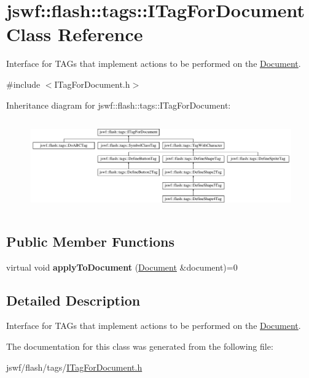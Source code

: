 \hypertarget{classjswf_1_1flash_1_1tags_1_1_i_tag_for_document}{\section{jswf\+:\+:flash\+:\+:tags\+:\+:I\+Tag\+For\+Document Class Reference}
\label{classjswf_1_1flash_1_1tags_1_1_i_tag_for_document}
}


Interface for {\ttfamily T\+A\+G}s that implement actions to be performed on the \hyperlink{classjswf_1_1flash_1_1_document}{Document}.  




{\ttfamily \#include $<$I\+Tag\+For\+Document.\+h$>$}

Inheritance diagram for jswf\+:\+:flash\+:\+:tags\+:\+:I\+Tag\+For\+Document\+:\begin{figure}[H]
\begin{center}
\leavevmode
\includegraphics[height=3.962264cm]{classjswf_1_1flash_1_1tags_1_1_i_tag_for_document}
\end{center}
\end{figure}
\subsection*{Public Member Functions}
\begin{DoxyCompactItemize}
\item 
\hypertarget{classjswf_1_1flash_1_1tags_1_1_i_tag_for_document_a514c81dde789ab9e919ebd4873502903}{virtual void {\bfseries apply\+To\+Document} (\hyperlink{classjswf_1_1flash_1_1_document}{Document} \&document)=0}\label{classjswf_1_1flash_1_1tags_1_1_i_tag_for_document_a514c81dde789ab9e919ebd4873502903}

\end{DoxyCompactItemize}


\subsection{Detailed Description}
Interface for {\ttfamily T\+A\+G}s that implement actions to be performed on the \hyperlink{classjswf_1_1flash_1_1_document}{Document}. 

The documentation for this class was generated from the following file\+:\begin{DoxyCompactItemize}
\item 
jswf/flash/tags/\hyperlink{_i_tag_for_document_8h}{I\+Tag\+For\+Document.\+h}\end{DoxyCompactItemize}
